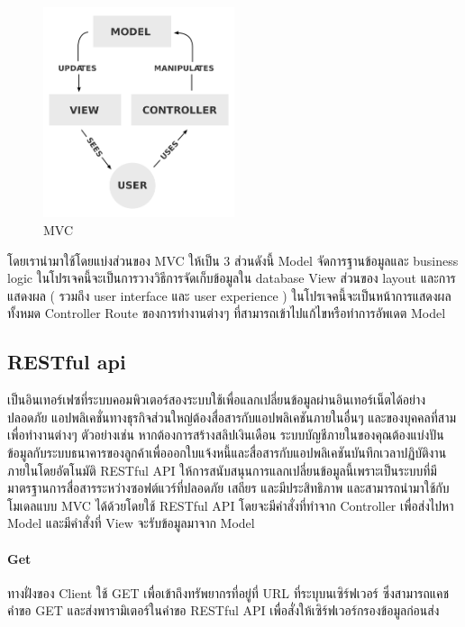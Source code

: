 \newpage
\begin{figure}[h]
        \centering
        \includegraphics[width= 0.5\textwidth]{mvc.png}
        \caption{MVC}
        \label{fig: mvc (Model-View-Controller)}
\end{figure}
โดยเรานำมาใช้โดยแบ่งส่วนของ MVC ให้เป็น 3 ส่วนดังนี้
Model
จัดการฐานข้อมูลและ business logic ในโปรเจคนี้จะเป็นการวางวิธีการจัดเก็บข้อมูลใน database
View
ส่วนของ layout และการแสดงผล ( รวมถึง user interface และ user experience ) ในโปรเจคนี้จะเป็นหน้าการแสดงผลทั้งหมด
Controller
Route ของการทำงานต่างๆ ที่สามารถเข้าไปแก้ไขหรือทำการอัพเดต Model

\subsection{RESTful api}
\par เป็นอินเทอร์เฟซที่ระบบคอมพิวเตอร์สองระบบใช้เพื่อแลกเปลี่ยนข้อมูลผ่านอินเทอร์เน็ตได้อย่างปลอดภัย แอปพลิเคชั่นทางธุรกิจส่วนใหญ่ต้องสื่อสารกับแอปพลิเคชันภายในอื่นๆ และของบุคคลที่สามเพื่อทำงานต่างๆ ตัวอย่างเช่น หากต้องการสร้างสลิปเงินเดือน ระบบบัญชีภายในของคุณต้องแบ่งปันข้อมูลกับระบบธนาคารของลูกค้าเพื่อออกใบแจ้งหนี้และสื่อสารกับแอปพลิเคชันบันทึกเวลาปฏิบัติงานภายในโดยอัตโนมัติ RESTful API ให้การสนับสนุนการแลกเปลี่ยนข้อมูลนี้เพราะเป็นระบบที่มีมาตรฐานการสื่อสารระหว่างซอฟต์แวร์ที่ปลอดภัย เสถียร และมีประสิทธิภาพ และสามารถนำมาใช้กับโมเดลแบบ MVC ได้ด้วยโดยใช้ RESTful API โดยจะมีคำสั่งที่ทำจาก Controller เพื่อส่งไปหา Model และมีคำสั่งที่ View จะรับข้อมูลมาจาก Model

\paragraph*{Get}
ทางฝั่งของ Client ใช้ GET เพื่อเข้าถึงทรัพยากรที่อยู่ที่ URL ที่ระบุบนเซิร์ฟเวอร์ ซึ่งสามารถแคชคำขอ GET และส่งพารามิเตอร์ในคำขอ RESTful API เพื่อสั่งให้เซิร์ฟเวอร์กรองข้อมูลก่อนส่ง


